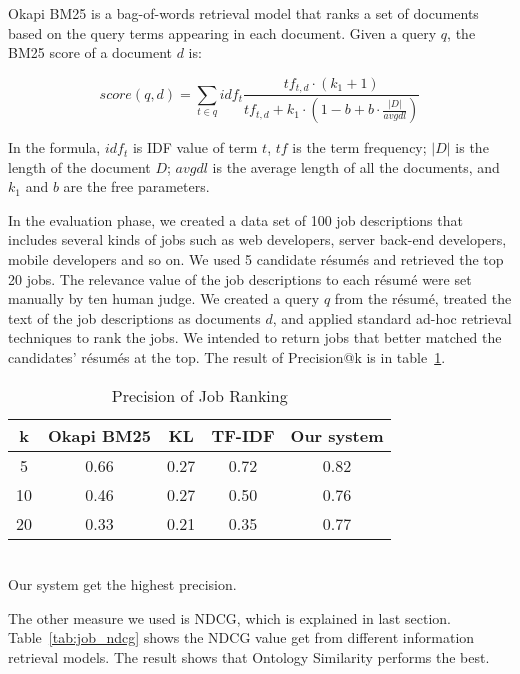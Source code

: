 Okapi BM25 is a bag-of-words retrieval model that ranks a set of documents based on the query terms appearing in each document. Given a query $q$, the BM25 score of a document $d$ is:

$$ score(q,d) = \sum_{ t \in q  }  idf_t \frac {tf_{t,d} \cdot(k_1 +1) }  {tf_{t,d} +k_1 \cdot ( 1-b + b\cdot \frac { \left | D \right |}{avgdl})}  $$

In the formula, $idf_t$ is IDF value of term $t$, $tf$ is the term frequency; $ |D|$ is the length of the document $D$; $avgdl$ is the average length of all the documents, and $k_1$ and $b$ are the free parameters.

In the evaluation phase, we created a data set of 100 job descriptions that includes several kinds of jobs such as web developers, server back-end developers, mobile developers and so on. We used 5 candidate r\'esum\'es and retrieved the top 20 jobs.  The relevance value of the job descriptions to each r\'esum\'e were set manually by ten human judge. We created a query $q$ from the r\'esum\'e, treated the text of the job descriptions as documents $d$, and applied standard ad-hoc retrieval techniques to rank the jobs. We intended to return jobs that better matched the candidates' r\'esum\'es at the top. The result of Precision@k is in table~\ref{tab:job_precision}.


\begin{table}[ht]
\caption{Precision of Job Ranking } %
\centering %
\begin{tabular}{    | c | c | c | c | c |  }
 \hline
       k     & Okapi BM25 & KL    & TF-IDF   & Our system  \\
 \hline
       5     & 0.66       & 0.27  & 0.72     & 0.82   \\
 \hline
       10    & 0.46       & 0.27  & 0.50     & 0.76   \\
 \hline
       20    & 0.33       & 0.21  & 0.35     & 0.77   \\
 \hline

\end{tabular}
\label{tab:job_precision} %
\\Our system get the highest precision.
\end{table}

The other measure we used is NDCG, which is explained in last section. Table~\ref{tab:job_ndcg} shows the NDCG value get from different information retrieval models. The result shows that Ontology Similarity  performs the best.

